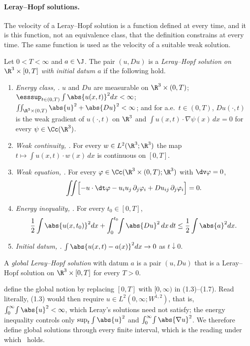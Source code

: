\documentclass[11pt,reqno]{amsart}
\begin{document}
\paragraph{Leray--Hopf solutions.}
The velocity of a Leray--Hopf solution is a function defined at every time,
and it is this function, not an equivalence class, that the definition
constrains at every time. The same function is used as the velocity of a
suitable weak solution.

\begin{definition}\label{def:leray-hopf}
Let $0<T<\infty$ and $a\in\J$. The pair $(u,Du)$ is a \emph{Leray--Hopf
solution on $\R^3\times[0,T]$ with initial datum $a$} if the following hold.
\begin{enumerate}[label=(LH\arabic*)]
\item\label{LH:class} \emph{Energy class, \cite[(1.3)]{ESS2003}.} $u$ and $Du$
  are measurable on $\R^3\times(0,T)$;
  $\esssup_{t\in(0,T)}\int\abs{u(x,t)}^2dx<\infty$;
  $\iint_{\R^3\times(0,T)}\abs{u}^2+\abs{Du}^2<\infty$; and for a.e.\
  $t\in(0,T)$, $Du(\cdot,t)$ is the weak gradient of $u(\cdot,t)$ on $\R^3$
  and $\int u(x,t)\cdot\nabla\psi(x)\,dx=0$ for every $\psi\in\Cc(\R^3)$.
\item\label{LH:weakcont} \emph{Weak continuity, \cite[(1.4)]{ESS2003}.} For
  every $w\in L^2(\R^3;\R^3)$ the map $t\mapsto\int u(x,t)\cdot w(x)\,dx$ is
  continuous on $[0,T]$.
\item\label{LH:eq} \emph{Weak equation, \cite[(1.5)]{ESS2003}.} For every
  $\varphi\in\Cc(\R^3\times(0,T);\R^3)$ with $\dv\varphi=0$,
  \[
  \iint\Bigl[-u\cdot\dt\varphi-u_iu_j\,\partial_j\varphi_i+Du_{ij}\,\partial_j\varphi_i\Bigr]=0 .
  \]
\item\label{LH:energy} \emph{Energy inequality, \cite[(1.6)]{ESS2003}.} For
  every $t_0\in[0,T]$,
  \[
  \frac12\int\abs{u(x,t_0)}^2dx+\int_0^{t_0}\!\!\int\abs{Du}^2\,dx\,dt\le\frac12\int\abs{a}^2dx .
  \]
\item\label{LH:initial} \emph{Initial datum, \cite[(1.7)]{ESS2003}.}
  $\int\abs{u(x,t)-a(x)}^2dx\to0$ as $t\downarrow0$.
\end{enumerate}
A \emph{global Leray--Hopf solution} with datum $a$ is a pair $(u,Du)$ that is
a Leray--Hopf solution on $\R^3\times[0,T]$ for every $T>0$.
\end{definition}

\begin{remark}\label{rem:global-LH}
\cite{ESS2003} define the global notion by replacing $[0,T]$ with $[0,\infty)$
in (1.3)--(1.7). Read literally, (1.3) would then require
$u\in L^2(0,\infty;W^{1,2})$, that is, $\int_0^\infty\!\int\abs{u}^2<\infty$,
which Leray's solutions need not satisfy; the energy inequality controls
only $\sup_t\int\abs{u}^2$ and $\int_0^\infty\!\int\abs{\nabla u}^2$. We therefore
define global solutions through every finite interval, which is the reading
under which~\cite[Theorem~1.1]{ESS2003} holds.
\end{remark}
\end{document}
